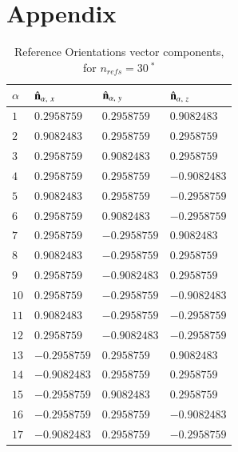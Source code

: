 \documentclass[preprint,  3p]{elsarticle}
\begin{document}
\newpage
\appendix
\onecolumn
\section*{Appendix}
\setcounter{table}{0}
\renewcommand{\thetable}{A\arabic{table}}
\begin{table}[h]
	\begin{center}
		\caption{\label{tab:A1}
			Reference Orientations vector components, for $n_{refs} = 30 \ ^*$}
		\begin{tabularx}{0.9\textwidth}{
				| >{\centering\arraybackslash}X
				| >{\centering\arraybackslash}X
				| >{\centering\arraybackslash}X
				| >{\centering\arraybackslash}X | }
			\hline\hline
			$\alpha$ & $\hat{\bf n}_{\alpha,\ x}$ &  $\hat{\bf n}_{\alpha,\ y}$ &  $\hat{\bf n}_{\alpha,\ z}$ 
			\\ \hline
			$1$ & $0.2958759$ & $0.2958759$ & $0.9082483$ \\
			$2$ & $0.9082483$ & $0.2958759$ & $0.2958759$ \\
			$3$ & $0.2958759$ & $0.9082483$ & $0.2958759$ \\
			$4$ & $0.2958759$ & $0.2958759$ & $-0.9082483$ \\
			$5$ & $0.9082483$ & $0.2958759$ & $-0.2958759$ \\
			$6$ & $0.2958759$ & $0.9082483$ & $-0.2958759$ \\
			$7$ & $0.2958759$ & $-0.2958759$ & $0.9082483$ \\
			$8$ & $0.9082483$ & $-0.2958759$ & $0.2958759$ \\
			$9$ & $0.2958759$ & $-0.9082483$ & $0.2958759$ \\
			$10$ & $0.2958759$ & $-0.2958759$ & $-0.9082483$ \\
			$11$ & $0.9082483$ & $-0.2958759$ & $-0.2958759$ \\
			$12$ & $0.2958759$ & $-0.9082483$ & $-0.2958759$ \\
			$13$ & $-0.2958759$ & $0.2958759$ & $0.9082483$ \\
			$14$ & $-0.9082483$ & $0.2958759$ & $0.2958759$ \\
			$15$ & $-0.2958759$ & $0.9082483$ & $0.2958759$ \\
			$16$ & $-0.2958759$ & $0.2958759$ & $-0.9082483$ \\
			$17$ & $-0.9082483$ & $0.2958759$ & $-0.2958759$ \\

\end{tabularx}
\end{center}
\end{table}
\end{document}
